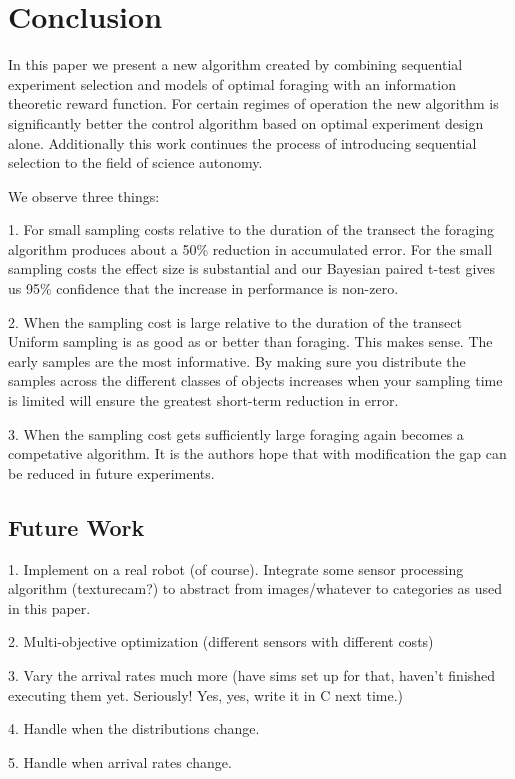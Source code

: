 \section{Conclusion}
\label{sec:conclusion}

In this paper we present a new algorithm created by combining sequential experiment selection and models of optimal foraging with an information theoretic reward function.  For certain regimes of operation the new algorithm is significantly better the control algorithm based on optimal experiment design alone.  Additionally this work continues the process of introducing sequential selection to the field of science autonomy.  

We observe three things:

1. For small sampling costs relative to the duration of the transect the foraging algorithm produces about a 50\% reduction in accumulated error.  For the small sampling costs the effect size is substantial and our Bayesian paired t-test gives us 95\% confidence that the increase in performance is non-zero.

2. When the sampling cost is large relative to the duration of the transect Uniform sampling is as good as or better than foraging.  This makes sense.  The early samples are the most informative.  By making sure you distribute the samples across the different classes of objects increases when your sampling time is limited will ensure the greatest short-term reduction in error.

3. When the sampling cost gets sufficiently large foraging again becomes a competative algorithm.  It is the authors hope that with modification the gap can be reduced in future experiments.


\subsection{Future Work}

1. Implement on a real robot (of course).  Integrate some sensor processing algorithm (texturecam?) to abstract from images/whatever to categories as used in this paper.

2. Multi-objective optimization (different sensors with different costs)

3. Vary the arrival rates much more (have sims set up for that, haven't finished executing them yet.  Seriously! Yes, yes, write it in C next time.)

4. Handle when the distributions change. 

5. Handle when arrival rates change.




